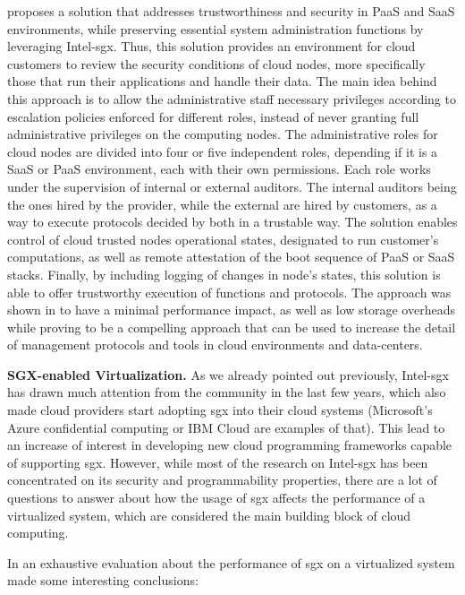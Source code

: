 \cite{sgxCloudThesis} proposes a solution that addresses trustworthiness and security in PaaS and SaaS environments, while preserving essential system administration functions by leveraging Intel-\gls{sgx}. Thus, this solution provides an environment for cloud customers to review the security conditions of cloud nodes, more specifically those that run their applications and handle their data.
The main idea behind this approach is to allow the administrative staff necessary privileges according to escalation policies enforced for different roles, instead of never granting full administrative privileges on the computing nodes.
The administrative roles for cloud nodes are divided into four or five independent roles, depending if it is a SaaS or PaaS environment, each with their own permissions. Each role works under the supervision of internal or external auditors. The internal auditors being the ones hired by the provider, while the external are hired by customers, as a way to execute protocols decided by both in a trustable way. The solution enables control of cloud trusted nodes operational states, designated to run customer's computations, as well as remote attestation of the boot sequence of PaaS or SaaS stacks. Finally, by including logging of changes in node's states, this solution is able to offer trustworthy execution of functions and protocols.
The approach was shown in \cite{sgxCloudThesis} to have a minimal performance impact, as well as low storage overheads while proving to be a compelling approach that can be used to increase the detail of management protocols and tools in cloud environments and data-centers.\newline

\textbf{SGX-enabled Virtualization.}
As we already pointed out previously, Intel-\gls{sgx} has drawn much attention from the community in the last few years, which also made cloud providers start adopting \gls{sgx} into their cloud systems (Microsoft's Azure confidential computing or IBM Cloud are examples of that). This lead to an increase of interest in developing new cloud programming frameworks capable of supporting \gls{sgx}.
However, while most of the research on Intel-\gls{sgx} has been concentrated on its security and programmability properties, there are a lot of questions to answer about how the usage of \gls{sgx} affects the performance of a virtualized system, which are considered the main building block of cloud computing.

In \cite{sgxVirtualizationPaper} an exhaustive evaluation about the performance of \gls{sgx} on a virtualized system made some interesting conclusions:

